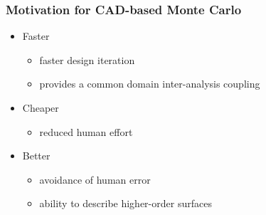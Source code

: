 \documentclass{beamer}
\begin{document}
\begin{frame}
\frametitle{Motivation for CAD-based Monte Carlo}

\begin{itemize}
\item Faster
	\begin{itemize}
	\item faster design iteration
	\item provides a common domain inter-analysis coupling
	\end{itemize}
\item Cheaper
	\begin{itemize}
	\item reduced human effort
	\end{itemize}
\item Better
	\begin{itemize}
	\item avoidance of human error
	\item ability to describe higher-order surfaces
	\end{itemize}
\end{itemize}

\end{frame}
\end{document}
